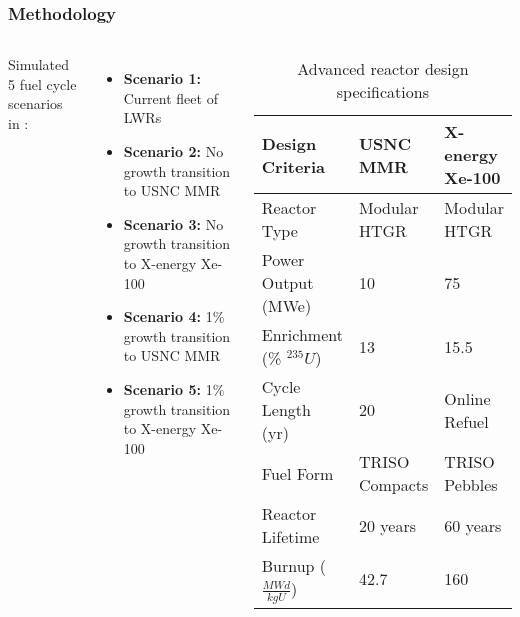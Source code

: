 \begin{frame}
    \frametitle{Methodology}
    \begin{columns}
        \column[t]{4.5cm}
        Simulated 5 fuel cycle scenarios in \Cyclus \cite{huff_fundamental_2016}:
    \begin{itemize}
        \item \textbf{Scenario 1:} Current fleet of \glspl{LWR}
        \item \textbf{Scenario 2:} No growth transition to \gls{USNC} \gls{MMR}
        \item \textbf{Scenario 3:} No growth transition to X-energy Xe-100
        \item \textbf{Scenario 4:} 1\% growth transition to \gls{USNC} \gls{MMR}
        \item \textbf{Scenario 5:} 1\% growth transition to X-energy Xe-100
    \end{itemize}

    \column[t]{5.5cm}
    \begingroup
        \renewcommand{\arraystretch}{1.3} %
        \vspace{-0.8cm}
        \begin{table}[t!]
            \small
            \caption{Advanced reactor design specifications}
            \label{tab:reactor_summary}
            \begin{tabular}{ p{1.5cm} p{1.5cm} p{1.25cm}}
                \hline
                Design Criteria & \gls{USNC} \gls{MMR} 
                    \cite{mitchell_usnc_2020} & 
                    X-energy Xe-100 \cite{harlan_x-energy_2018}
                    \cite{hussain_advances_2018}\\\hline
                Reactor Type & Modular HTGR & Modular HTGR \\
                Power Output (MWe) & 10 & 75 \\
                Enrichment (\% $^{235}U$) & 13 & 15.5 \\
                Cycle Length (yr) & 20 & Online Refuel\\
                Fuel Form & TRISO Compacts & TRISO Pebbles\\
                Reactor Lifetime & 20 years & 60 years \\
                Burnup ($\frac{MWd}{kg U}$) & 42.7 & 160 \\
                \hline
            \end{tabular}
        \end{table}   
        \endgroup
    \end{columns}
\end{frame}

